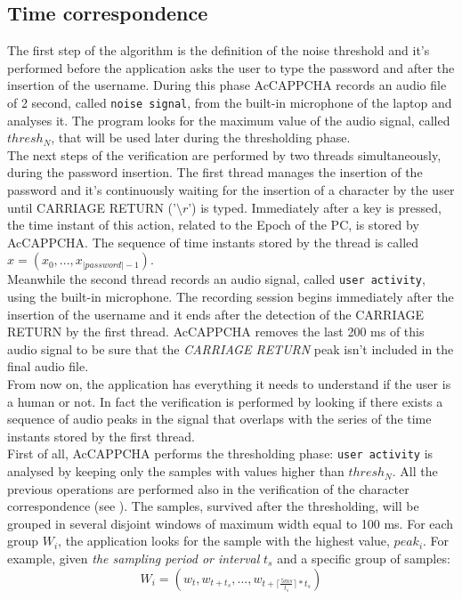 \subsection{Time correspondence}\label{AcCAPPCHA:time_correspondence}
The first step of the algorithm is the definition of the noise threshold and it's performed before the application asks the user to type the password and after the insertion of the username. During this phase AcCAPPCHA records an audio file of 2 second, called \texttt{noise signal}, from the built-in microphone of the laptop and analyses it. The program looks for the maximum value of the audio signal, called $thresh_N$, that will be used later during the thresholding phase.\\
The next steps of the verification are performed by two threads simultaneously, during the password insertion. The first thread manages the insertion of the password and it's continuously waiting for the insertion of a character by the user until CARRIAGE RETURN ('$\setminus r$') is typed. Immediately after a key is pressed, the time instant of this action, related to the Epoch of the PC, is stored by AcCAPPCHA. The sequence of time instants stored by the thread is called $x=(x_0, ..., x_{|password|-1})$.\\
Meanwhile the second thread records an audio signal, called \texttt{user activity}, using the built-in microphone. The recording session begins immediately after the insertion of the username and it ends after the detection of the CARRIAGE RETURN by the first thread. AcCAPPCHA removes the last 200 ms of this audio signal to be sure that the \textit{CARRIAGE RETURN} peak isn't included in the final audio file.\\
From now on, the application has everything it needs to understand if the user is a human or not. In fact the verification is performed by looking if there exists a sequence of audio peaks in the signal that overlaps with the series of the time instants stored by the first thread.\\
First of all, AcCAPPCHA performs the thresholding phase: \texttt{user activity} is analysed by keeping only the samples with values higher than $thresh_N$. All the previous operations are performed also in the verification of the character correspondence (see ). The samples, survived after the thresholding, will be grouped in several disjoint windows of maximum width equal to 100 ms. For each group $W_i$, the application looks for the sample with the highest value, $peak_i$. For example, given \textit{the sampling period or interval} $t_s$ and a specific group of samples: $$W_i = (w_t, w_{t+t_s}, ..., w_{t+\lceil \frac{5ms}{t_s}\rceil * t_s})$$
